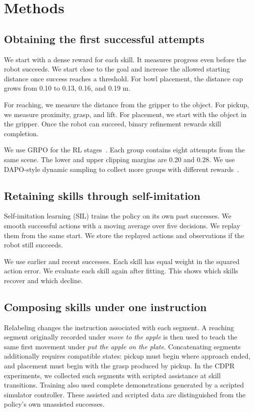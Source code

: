 \section{Methods}\label{sec:method}




\subsection{Obtaining the first successful attempts}\label{sec:skill_acquisition}
We start with a dense reward for each skill. It measures progress even before the robot succeeds. We start close to the goal and increase the allowed starting distance once success reaches a threshold. For bowl placement, the distance cap grows from 0.10 to 0.13, 0.16, and 0.19 m.

For reaching, we measure the distance from the gripper to the object. For pickup, we measure proximity, grasp, and lift. For placement, we start with the object in the gripper. Once the robot can succeed, binary refinement rewards skill completion.

We use GRPO for the RL stages~\cite{deepseekmath}. Each group contains eight attempts from the same scene. The lower and upper clipping margins are 0.20 and 0.28. We use DAPO-style dynamic sampling to collect more groups with different rewards~\cite{dapo}.


\subsection{Retaining skills through self-imitation}\label{sec:retention_method}
Self-imitation learning (SIL) trains the policy on its own past successes. We smooth successful actions with a moving average over five decisions. We replay them from the same start. We store the replayed actions and observations if the robot still succeeds.

We use earlier and recent successes. Each skill has equal weight in the squared action error. We evaluate each skill again after fitting. This shows which skills recover and which decline.

\subsection{Composing skills under one instruction}\label{sec:composition}
Relabeling changes the instruction associated with each segment. A reaching segment originally recorded under \emph{move to the apple} is then used to teach the same first movement under \emph{put the apple on the plate}. Concatenating segments additionally requires compatible states: pickup must begin where approach ended, and placement must begin with the grasp produced by pickup. In the CDPR experiments, we collected such segments with scripted assistance at skill transitions. Training also used complete demonstrations generated by a scripted simulator controller. These assisted and scripted data are distinguished from the policy's own unassisted successes.


